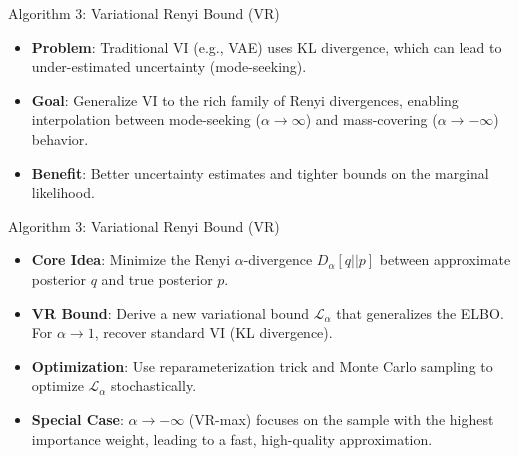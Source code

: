 \documentclass[10pt]{beamer}
\begin{document}
\begin{frame}{Algorithm 3: Variational Renyi Bound (VR)}

\begin{itemize}
    \item \textbf{Problem}: Traditional VI (e.g., VAE) uses KL divergence, which can lead to under-estimated uncertainty (mode-seeking).
    \item \textbf{Goal}: Generalize VI to the rich family of Renyi divergences, enabling interpolation between mode-seeking ($\alpha \to \infty$) and mass-covering ($\alpha \to -\infty$) behavior.
    \item \textbf{Benefit}: Better uncertainty estimates and tighter bounds on the marginal likelihood.
\end{itemize}
\end{frame}

\begin{frame}{Algorithm 3: Variational Renyi Bound (VR)}

\begin{itemize}
    \item \textbf{Core Idea}: Minimize the Renyi $\alpha$-divergence $D_\alpha[q || p]$ between approximate posterior $q$ and true posterior $p$.
    \item \textbf{VR Bound}: Derive a new variational bound $\mathcal{L}_\alpha$ that generalizes the ELBO. For $\alpha \to 1$, recover standard VI (KL divergence).
    \item \textbf{Optimization}: Use reparameterization trick and Monte Carlo sampling to optimize $\mathcal{L}_\alpha$ stochastically.
    \item \textbf{Special Case}: $\alpha \to -\infty$ (VR-max) focuses on the sample with the highest importance weight, leading to a fast, high-quality approximation.
\end{itemize}
\end{frame}
\end{document}
